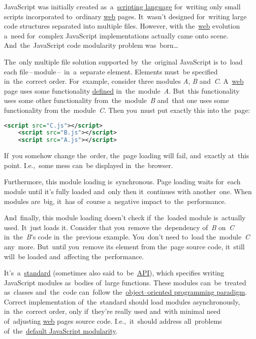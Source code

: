 \label{javascriptmodularity}
JavaScript was initially created as~a~\hyperref[scriptinglanguages]{scripting language} for~writing only small scripts incorporated to~ordinary \hyperref[internetweb]{web} pages.
It~wasn't designed for~writing large code structures separated into multiple files.
However, with the~\hyperref[internetweb]{web} evolution a~need for~complex JavaScript implementations actually came onto scene.
And~the~JavaScript code modularity problem was~born\dots

The~only multiple file solution supported by~the~original JavaScript is to~load each file\,--\,module\,--\, in~a~separate  element.
Elements must~be specified in~the~correct order.
For~example, consider three modules \textit{A}, \textit{B} and~\textit{C}.
A~\hyperref[internetweb]{web} page uses some functionality \hyperref[declarationdefinition]{defined} in~the~module~\textit{A}.
But~this functionality uses some other functionality from~the~module~\textit{B} and~that one uses some functionality from the~module~\textit{C}.
Then you~must put exactly this into the~page:

\begin{lstlisting}[language=XML,frame=no]
    <script src="C.js"></script>
    <script src="B.js"></script>
    <script src="A.js"></script>
\end{lstlisting}

\noindent If~you somehow change the~order, the~page loading will fail, and~exactly at~this point.
I.e.,~some mess can~be displayed in~the~browser.

Furthermore, this module loading is~synchronous.
Page loading waits for~each module until it's fully loaded and~only then it~continues with another~one.
When modules are~big, it~has of~course a~negative impact to~the~performance.

And~finally, this module loading doesn't check if~the~loaded module is~actually used.
It~just loads it.
Consider that you~remove the~dependency of~\textit{B} on~\textit{C} in~the~\textit{B}'s code in~the~previous example.
You~don't need to~load the~module~\textit{C} any~more.
But~until you~remove its  element from the~page source code, it~still will~be loaded and~affecting the~performance.

\label{amd}
It's~a~\hyperref[protocolstandard]{standard} (sometimes also said to~be~\hyperref[api]{API}), which specifies writing JavaScript modules as~bodies of~large functions.
These modules can~be~treated as~classes and~the~code can~follow the~\hyperref[objectorientedprogramming]{object--oriented programming paradigm}.
Correct implementation of~the~standard should load modules asynchronously, in~the~correct order, only if~they're really used and~with minimal need of~adjusting \hyperref[internetweb]{web} pages source code.
I.e.,~it~should address all~problems of~the~\hyperref[javascriptmodularity]{default JavaScript modularity}.

